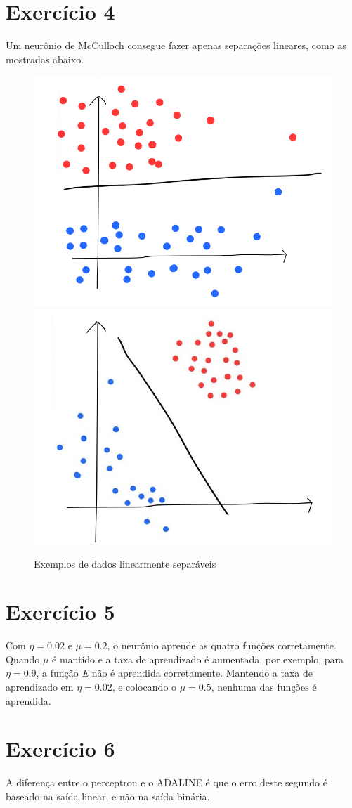 \documentclass[a4]{article}
\begin{document}
\section*{Exercício 4}

Um neurônio de McCulloch consegue fazer apenas separações lineares, como as mostradas abaixo.

\begin{figure}[H]
	\centering
	\includegraphics[width=0.45\linewidth]{esquema1}
	\includegraphics[width=0.45\linewidth]{esquema2}
	\caption{Exemplos de dados linearmente separáveis}
\end{figure}

\section*{Exercício 5}

Com $ \eta = 0.02 $ e $ \mu = 0.2 $, o neurônio aprende as quatro funções corretamente. Quando $ \mu $ é mantido e a taxa de aprendizado é aumentada, por exemplo, para $ \eta = 0.9 $, a função \textit{E} não é aprendida corretamente. Mantendo a taxa de aprendizado em $ \eta = 0.02 $, e colocando o $ \mu = 0.5 $, nenhuma das funções é aprendida.
 
\section*{Exercício 6}

A diferença entre o perceptron e o ADALINE é que o erro deste segundo é baseado na saída linear, e não na saída binária.
\end{document}
